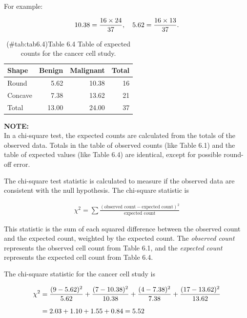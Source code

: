\documentclass[
]{report}
\begin{document}
For example:

\begin{align}
10.38 = \frac{16 \times 24}{37}, \notag
\quad
5.62 = \frac{16 \times 13}{37}. \notag
\end{align}

\begin{table}

\caption{(\#tab:tab6.4)Table 6.4 Table of expected counts for the cancer cell study.}
\centering
\begin{tabular}[t]{lrrr}
\toprule
Shape & Benign & Malignant & Total\\
\midrule
Round & 5.62 & 10.38 & 16\\
Concave & 7.38 & 13.62 & 21\\
Total & 13.00 & 24.00 & 37\\
\bottomrule
\end{tabular}
\end{table}

\large

\textbf{NOTE:}\\
In a chi-square test, the expected counts are calculated from the totals of the observed data. Totals in the table of observed counts (like Table 6.1) and the table of expected values (like Table 6.4) are identical, except for possible round-off error.\\
\normalsize

The chi-square test statistic is calculated to measure if the observed data are consistent with the null
hypothesis. The chi-square statistic is

\begin{align} \label{6.3}
\chi^2 = \sum \frac{(\text{observed count} - \text{expected count})^2}{\text{expected count}} 
\tag{6.3}
\end{align}

This statistic is the sum of each squared difference between the observed count and the expected count,
weighted by the expected count. The \emph{observed count} represents the observed cell count from Table 6.1, and
the \emph{expected count} represents the expected cell count from Table 6.4.

The chi-square statistic for the cancer cell study is

\begin{align}
\chi^2
&= \frac{(9 - 5.62)^2}{5.62} + \frac{(7 - 10.38)^2}{10.38} + \frac{(4 - 7.38)^2}{7.38} + \frac{(17 - 13.62)^2}{13.62} \\[6pt] \notag
&= 2.03 + 1.10 + 1.55 + 0.84 = 5.52 \notag
\end{align}
\end{document}
